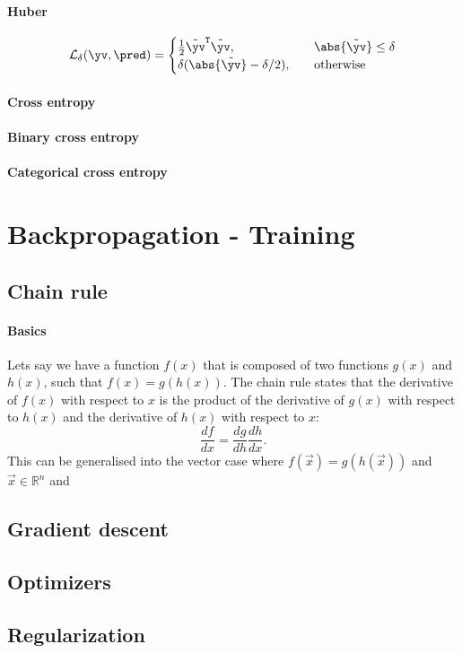         \paragraph{Huber}
            \begin{equation}
                \mathcal{L}_\delta(\yv, \pred) = 
                \begin{cases}
                    \frac{1}{2}\tilde{\yv}^\mathtt{T}\tilde{\yv}, \quad & \abs{\tilde{\yv}}\leq\delta \\
                    \delta(\abs{\tilde{\yv}} - \delta/2), \quad & \mathrm{otherwise}
                \end{cases}
            \end{equation}


        \paragraph{Cross entropy}

        \paragraph{Binary cross entropy}

        \paragraph{Categorical cross entropy}

\section{Backpropagation - Training}
    \subsection{Chain rule}
        \paragraph{Basics}
        Lets say we have a function $f(x)$ that is composed of two functions $g(x)$ and $h(x)$, such that $f(x) = g(h(x))$. The chain rule states that the derivative of $f(x)$ with respect to $x$ is the product of the derivative of $g(x)$ with respect to $h(x)$ and the derivative of $h(x)$ with respect to $x$:
        \begin{equation}
            \frac{df}{dx} = \frac{dg}{dh} \frac{dh}{dx}.
        \end{equation}
        This can be generalised into the vector case where $f(\vec{x}) = g(h(\vec{x}))$ and $\vec{x} \in \mathbb{R}^n$ and 
    \subsection{Gradient descent}
    \subsection{Optimizers}
    \subsection{Regularization} %




